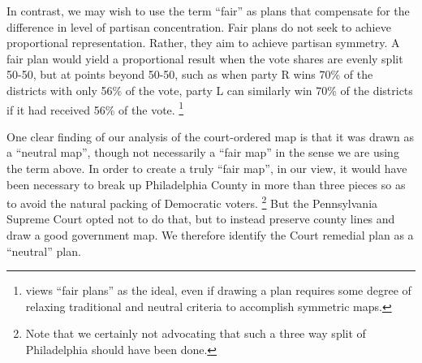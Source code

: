 \par
    In contrast, we may wish to use the term ``fair'' as plans that compensate for the difference in level of partisan concentration. Fair plans do not seek to achieve proportional representation. Rather, they aim to achieve partisan symmetry. A fair plan would yield a proportional result when the vote shares are evenly split 50-50, but at points beyond 50-50, such as when party R wins 70\% of the districts with only 56\% of the vote, party L can similarly win 70\% of the districts if it had received 56\% of the vote.
    \footnote{\citet{Nagle2019_ELJ} views ``fair plans'' as the ideal, even if drawing a plan requires some degree of relaxing traditional and neutral criteria to accomplish symmetric maps.}
%
\par
    One clear finding of our analysis of the court-ordered map is that it was drawn as a ``neutral map'', though not necessarily a ``fair map'' in the sense we are using the term above. In order to create a truly ``fair map'', in our view, it would have been necessary to break up Philadelphia County in more than three pieces so as to avoid the natural packing of Democratic voters.
        \footnote{Note that we certainly not advocating that such a three way split of Philadelphia should have been done.}
    But the Pennsylvania Supreme Court opted not to do that, but to instead preserve county lines and draw a good government map. We therefore identify the Court remedial plan as a ``neutral'' plan.
\par
%
